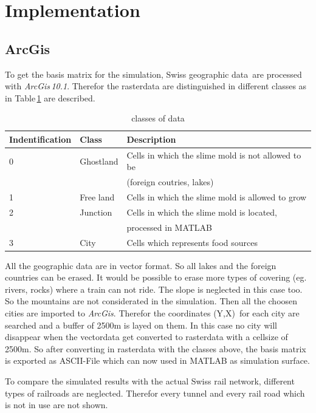 \documentclass[11pt]{scrartcl}
\begin{document}
\section{Implementation}
\subsection{ArcGis}
\label{sec:arcgis}

To get the basis matrix for the simulation, Swiss geographic data\,\cite{gis_data} are processed with \textit{ArcGis\,10.1}. Therefor the rasterdata are distinguished in different classes as in Table\,\ref{tab:class} are described.

\begin{table}[H]
	\centering
	\caption{classes of data}
		\begin{tabular}{lll}
		\toprule
		Indentification & Class & Description \\
		\midrule
		0 & Ghostland & Cells in which the slime mold is not allowed to be\\
		& 		& (foreign coutries, lakes)\\
		1 & Free land & Cells in which the slime mold is allowed to grow\\
		2 & Junction & Cells in which the slime mold is located, \\
		& & processed in MATLAB\\
		3 & City & Cells which represents food sources\\
		\bottomrule
	\end{tabular}
\label{tab:class}
\end{table}

All the geographic data are in vector format. So all lakes and the foreign countries can be erased. It would be possible to erase more types of covering (eg. rivers, rocks) where a train can not ride. The slope is neglected in this case too. So the mountains are not considerated in the simulation. Then all the choosen cities are imported to \textit{ArcGis}. Therefor the coordinates (Y,X)\,\cite{coordinates} for each city are searched and a buffer of 2500m is layed on them. In this case no city will disappear when the vectordata get converted to rasterdata with a cellsize of 2500m. So after converting in rasterdata with the classes above, the basis matrix is exported as ASCII-File which can now used in MATLAB as simulation surface.

To compare the simulated results with the actual Swiss rail network, different types of railroads are neglected. Therefor every tunnel and every rail road which is not in use are not shown.
\end{document}
